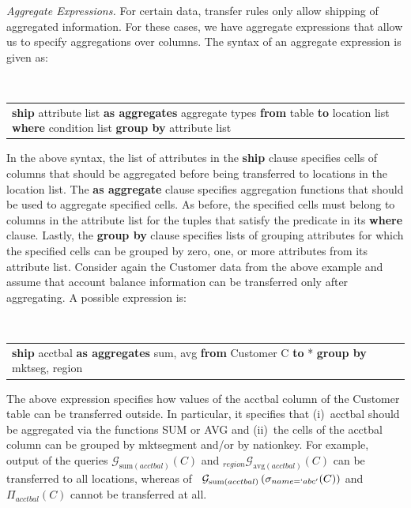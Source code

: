 \documentclass[11pt]{article}
\newenvironment{expression}{
  \par\addvspace{0.25\baselineskip}\noindent\tt\small
    \begin{tabular}{p{\columnwidth}}}{
      \end{tabular}\par\addvspace{0.25\baselineskip}
    }
\begin{document}
\vspace{0.1cm}
\noindent\textit{Aggregate Expressions.}
For certain data, transfer rules only allow shipping of
aggregated information. For these cases, we have aggregate
expressions that allow us to specify aggregations over
columns. The syntax of an aggregate expression is given as:
\begin{expression}
  \textbf{ship} attribute list \textbf{as aggregates}
  aggregate types \textbf{from} table  \textbf{to} location
  list \textbf{where} condition list \textbf{group by}
  attribute list
\end{expression}
In the above syntax, the list of attributes in the
\textbf{ship} clause specifies cells of columns that should
be aggregated before being transferred to locations in the
location list. The \textbf{as aggregate} clause specifies
aggregation functions that should be used to aggregate
specified cells. As before, the specified cells must belong
to columns in the attribute list for the tuples that satisfy
the predicate in its \textbf{where} clause. Lastly, the
\textbf{group by} clause specifies lists of grouping
attributes for which the specified cells can be grouped by
zero, one, or more attributes from its attribute list.
Consider again the Customer data from the above example and assume
that account balance information can be transferred only after
aggregating. A possible expression is:
\begin{expression}
  \textbf{ship} acctbal \textbf{as aggregates} sum, avg
  \textbf{from} Customer C \textbf{to} * \textbf{group by}
  mktseg, region
\end{expression}

\noindent The above expression specifies how values of the
acctbal column of the Customer table can be transferred
outside. In particular, it specifies that (i)~acctbal should
be aggregated via the functions SUM or AVG and (ii)~the
cells of the acctbal column can be grouped by mktsegment
and/or by nationkey. For example, output of the queries
$\mathcal{G}_{\text{sum}(acctbal)}(C)$ and
$_{region}\mathcal{G}_{\text{avg}(acctbal)}(C) $ can be transferred
to all locations, whereas of~
$\allowbreak\mathcal{G}_{\text{sum}(acctbal)}\left(\sigma_{name=`abc'}(C)\right)$
and $\Pi_{acctbal}(C)$ cannot be transferred at all.
\end{document}
